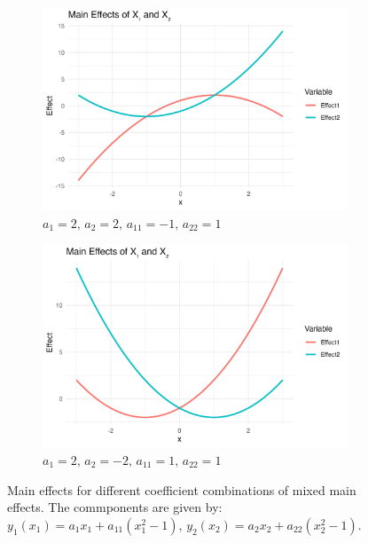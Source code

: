 \begin{figure}[htpb]
    \begin{subfigure}[t]{0.49\textwidth}
        \centering
        \includegraphics[width=\textwidth]{images/mixed_a1p20_a2p20_a11m10_a22p10_a12p00_rhop00_main.png}
        \caption{$a_1=2,\, a_2=2,\, a_{11}=-1,\, a_{22}=1$}
        \label{fig:mixed_rho_0_panel3}
    \end{subfigure}%
    \hfill
    \begin{subfigure}[t]{0.49\textwidth}
        \centering
        \includegraphics[width=\textwidth]{images/mixed_a1p20_a2m20_a11p10_a22p10_a12p00_rhop00_main.png}
        \caption{$a_1=2,\, a_2=-2,\, a_{11}=1,\, a_{22}=1$}
        \label{fig:mixed_rho_0_panel4}
    \end{subfigure}

    \caption{Main effects for different coefficient combinations of mixed main effects. The commponents are given by: $y_1(x_1) = a_1 x_1 + a_{11}(x_1^2 - 1)$, $y_2(x_2) = a_2 x_2 + a_{22}(x_2^2 - 1)$.}
    \label{fig:mixed_main_effects}
\end{figure}




